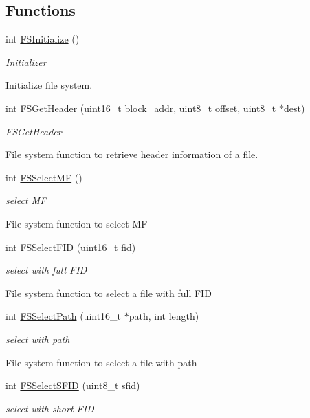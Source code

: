 \subsection*{Functions}
\begin{DoxyCompactItemize}
\item 
int \hyperlink{group__fs_ga5f5f0f157759a32e861b2d8177911353}{F\-S\-Initialize} ()
\begin{DoxyCompactList}\small\item\em Initializer

Initialize file system. \end{DoxyCompactList}\item 
int \hyperlink{group__fs_gafed36802a2254132739776c576c0e53e}{F\-S\-Get\-Header} (uint16\-\_\-t block\-\_\-addr, uint8\-\_\-t offset, uint8\-\_\-t $\ast$dest)
\begin{DoxyCompactList}\small\item\em F\-S\-Get\-Header

File system function to retrieve header information of a file. \end{DoxyCompactList}\item 
int \hyperlink{group__fs_gab1bf818b552bb3c24080e3249112e026}{F\-S\-Select\-M\-F} ()
\begin{DoxyCompactList}\small\item\em select M\-F

File system function to select M\-F \end{DoxyCompactList}\item 
int \hyperlink{group__fs_ga6df8bb917f2541f08f75796623a956a4}{F\-S\-Select\-F\-I\-D} (uint16\-\_\-t fid)
\begin{DoxyCompactList}\small\item\em select with full F\-I\-D

File system function to select a file with full F\-I\-D \end{DoxyCompactList}\item 
int \hyperlink{group__fs_ga11624170ed19096e661a18cf31ae0cfb}{F\-S\-Select\-Path} (uint16\-\_\-t $\ast$path, int length)
\begin{DoxyCompactList}\small\item\em select with path

File system function to select a file with path \end{DoxyCompactList}\item 
int \hyperlink{group__fs_ga9e04aaa657e9c4bcca8323c8779fc687}{F\-S\-Select\-S\-F\-I\-D} (uint8\-\_\-t sfid)
\begin{DoxyCompactList}\small\item\em select with short F\-I\-D


\end{DoxyCompactList}
\end{DoxyCompactItemize}
